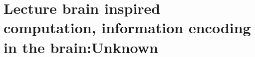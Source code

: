 \section{ Lecture brain inspired computation, information encoding in the brain:Unknown }\label{sec:q2}    

